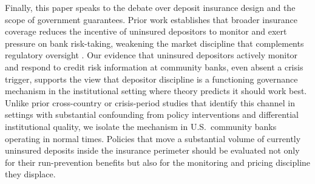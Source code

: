 Finally, this paper speaks to the debate over deposit insurance design and the
scope of government guarantees.  Prior work establishes that broader insurance
coverage reduces the incentive of uninsured depositors to monitor and exert
pressure on bank risk-taking, weakening the market discipline that complements
regulatory oversight \citep{demirgucc2004market, flannery2019market}.  Our
evidence that uninsured depositors actively monitor and respond to credit risk
information at community banks, even absent a crisis trigger, supports the view
that depositor discipline is a functioning governance mechanism in the
institutional setting where theory predicts it should work best.  Unlike prior
cross-country or crisis-period studies that identify this channel in settings
with substantial confounding from policy interventions and differential
institutional quality, we isolate the mechanism in U.S.\ community banks
operating in normal times.  Policies that move a substantial volume of currently
uninsured deposits inside the insurance perimeter should be evaluated not only
for their run-prevention benefits but also for the monitoring and pricing
discipline they displace.
